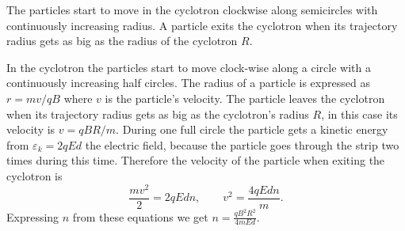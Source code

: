 {\ifEngHint
The particles start to move in the cyclotron clockwise along semicircles with continuously increasing radius. A particle exits the cyclotron when its trajectory radius gets as big as the radius of the cyclotron $R$.
\fi


\ifEngSolution
In the cyclotron the particles start to move clock-wise along a circle with a continuously increasing half circles. The radius of a particle is expressed as $r=mv/qB$ where $v$ is the particle’s velocity. The particle leaves the cyclotron when its trajectory radius gets as big as the cyclotron’s radius $R$, in this case its velocity is $v=qBR/m$. During one full circle the particle gets a kinetic energy from $\varepsilon_k=2qEd$ the electric field, because the particle goes through the strip two times during this time. Therefore the velocity of the particle when exiting the cyclotron is
\[\frac{mv^2}{2}=2qEdn, \qquad v^2=\frac{4qEdn}{m}.\]
Expressing $n$ from these equations we get $\displaystyle n=\frac{qB^2R^2}{4mEd}$.
\fi
}
